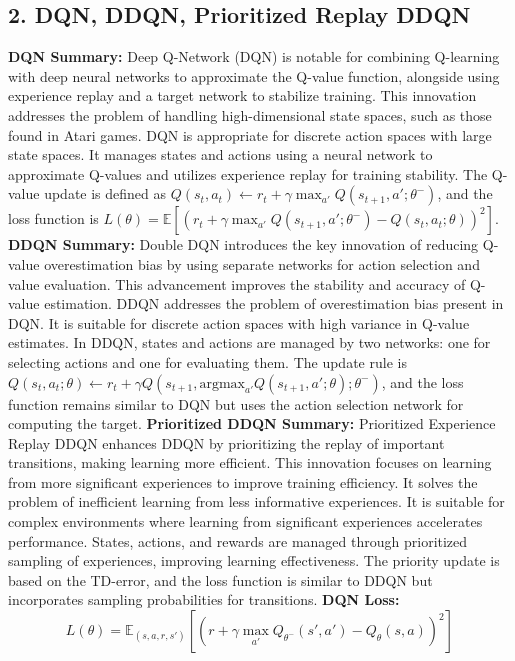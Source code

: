 \documentclass[a4paper,10pt]{article}
\begin{document}
\begin{multicols}{2}
\section*{2. DQN, DDQN, Prioritized Replay DDQN}
\textbf{DQN Summary:} Deep Q-Network (DQN) is notable for combining Q-learning with deep neural networks to approximate the Q-value function, alongside using experience replay and a target network to stabilize training. This innovation addresses the problem of handling high-dimensional state spaces, such as those found in Atari games. DQN is appropriate for discrete action spaces with large state spaces. It manages states and actions using a neural network to approximate Q-values and utilizes experience replay for training stability. The Q-value update is defined as \( Q(s_t, a_t) \leftarrow r_t + \gamma \max_{a'} Q(s_{t+1}, a'; \theta^-) \), and the loss function is \( L(\theta) = \mathbb{E} \left[ \left( r_t + \gamma \max_{a'} Q(s_{t+1}, a'; \theta^-) - Q(s_t, a_t; \theta) \right)^2 \right] \).
\textbf{DDQN Summary:} Double DQN introduces the key innovation of reducing Q-value overestimation bias by using separate networks for action selection and value evaluation. This advancement improves the stability and accuracy of Q-value estimation. DDQN addresses the problem of overestimation bias present in DQN. It is suitable for discrete action spaces with high variance in Q-value estimates. In DDQN, states and actions are managed by two networks: one for selecting actions and one for evaluating them. The update rule is \( Q(s_t, a_t; \theta) \leftarrow r_t + \gamma Q(s_{t+1}, \text{argmax}_{a'} Q(s_{t+1}, a'; \theta); \theta^-) \), and the loss function remains similar to DQN but uses the action selection network for computing the target.
\textbf{Prioritized DDQN Summary:} Prioritized Experience Replay DDQN enhances DDQN by prioritizing the replay of important transitions, making learning more efficient. This innovation focuses on learning from more significant experiences to improve training efficiency. It solves the problem of inefficient learning from less informative experiences. It is suitable for complex environments where learning from significant experiences accelerates performance. States, actions, and rewards are managed through prioritized sampling of experiences, improving learning effectiveness. The priority update is based on the TD-error, and the loss function is similar to DDQN but incorporates sampling probabilities for transitions.
\textbf{DQN Loss:}
\[
L(\theta) = \mathbb{E}_{(s, a, r, s')} \left[ \left( r + \gamma \max_{a'} Q_{\theta^-}(s', a') - Q_\theta(s, a) \right)^2 \right]
\]
\end{multicols}
\end{document}
